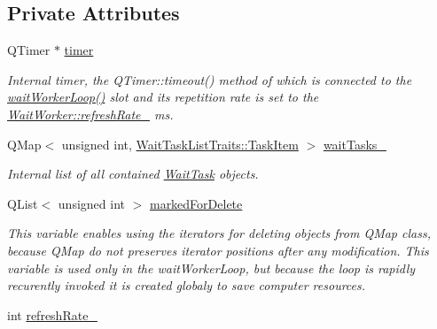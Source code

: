 \subsection*{Private Attributes}
\begin{DoxyCompactItemize}
\item 
\hypertarget{class_wait_worker_a87df3552b89aad0db75385398426a9c9}{}Q\+Timer $\ast$ \hyperlink{class_wait_worker_a87df3552b89aad0db75385398426a9c9}{timer}\label{class_wait_worker_a87df3552b89aad0db75385398426a9c9}

\begin{DoxyCompactList}\small\item\em Internal timer, the Q\+Timer\+::timeout() method of which is connected to the \hyperlink{class_wait_worker_a434d284c0e08697979b5c8c1a53fd529}{wait\+Worker\+Loop()} slot and its repetition rate is set to the \hyperlink{class_wait_worker_a088f21300ece1749e1e7e02a130275df}{Wait\+Worker\+::refresh\+Rate\+\_\+} ms. \end{DoxyCompactList}\item 
\hypertarget{class_wait_worker_a7fcda880e64348cdd84e2ebbb9926447}{}Q\+Map$<$ unsigned int, \hyperlink{struct_wait_task_list_traits_1_1_task_item}{Wait\+Task\+List\+Traits\+::\+Task\+Item} $>$ \hyperlink{class_wait_worker_a7fcda880e64348cdd84e2ebbb9926447}{wait\+Tasks\+\_\+}\label{class_wait_worker_a7fcda880e64348cdd84e2ebbb9926447}

\begin{DoxyCompactList}\small\item\em Internal list of all contained \hyperlink{class_wait_task}{Wait\+Task} objects. \end{DoxyCompactList}\item 
\hypertarget{class_wait_worker_affa716c2d16efa5df8492f21f11f3a2d}{}Q\+List$<$ unsigned int $>$ \hyperlink{class_wait_worker_affa716c2d16efa5df8492f21f11f3a2d}{marked\+For\+Delete}\label{class_wait_worker_affa716c2d16efa5df8492f21f11f3a2d}

\begin{DoxyCompactList}\small\item\em This variable enables using the iterators for deleting objects from Q\+Map class, because Q\+Map do not preserves iterator positions after any modification. This variable is used only in the wait\+Worker\+Loop, but because the loop is rapidly recurently invoked it is created globaly to save computer resources. \end{DoxyCompactList}\item 
\hypertarget{class_wait_worker_a088f21300ece1749e1e7e02a130275df}{}int \hyperlink{class_wait_worker_a088f21300ece1749e1e7e02a130275df}{refresh\+Rate\+\_\+}\label{class_wait_worker_a088f21300ece1749e1e7e02a130275df}


\end{DoxyCompactItemize}
